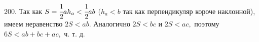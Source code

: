200. Так как $S=\cfrac{1}{2}a h_a<\cfrac{1}{2}ab$ ($h_a<b$ так как перпендикуляр короче наклонной), имеем неравенство $2S<ab.$ Аналогично $2S<bc$ и $2S<ac,$ поэтому $6S<ab+bc+ac,$ ч. т. д.\\
